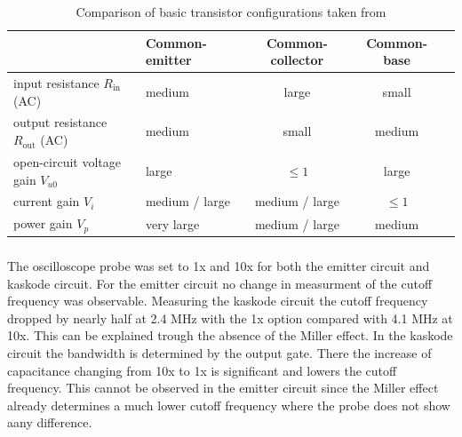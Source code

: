 \documentclass[a4paper,12pt]{article}
\begin{document}
	\begin{table}[ht]
		\centering
		\caption{Comparison of basic transistor configurations taken from \cite{Gossner_GrundlagenDerElektronik_2011_8A}}
		\begin{tabular}{llccc}
			\toprule
			& Common-emitter & Common-collector & Common-base \\
			\midrule
			\multirow{1}{*}{input resistance $R_{\mathrm{in}}$ (AC)} & medium & large & small \\
	
			\multirow{1}{*}{output resistance $R_{\mathrm{out}}$ (AC)} & medium & small & medium \\
	
			\multirow{1}{*}{open-circuit voltage gain $V_{u0}$} & large & $\leq 1$ & large \\
	
			\multirow{1}{*}{current gain $V_{i}$} & medium / large & medium / large & $\leq 1$ \\
	
			\multirow{1}{*}{power gain $V_{p}$} & very large & medium / large & medium \\
	
			\bottomrule
		\end{tabular}
	\end{table}
	
	\subsubsection{}
	
	The oscilloscope probe was set to 1x and 10x for both the emitter circuit and kaskode circuit. For the emitter circuit no change in measurment of the cutoff frequency was observable. Measuring the kaskode circuit the cutoff frequency dropped by nearly half at 2.4 MHz with the 1x option compared with 4.1 MHz at 10x.
	This can be explained trough the absence of the Miller effect. In the kaskode circuit the bandwidth is determined by the output gate. There the increase of capacitance changing from 10x to 1x is significant and lowers the cutoff frequency. This cannot be observed in the emitter circuit since the Miller effect already determines a much lower cutoff frequency where the probe does not show aany difference.
	
	
	
	\vfill
	
	
	
	
\end{document}
